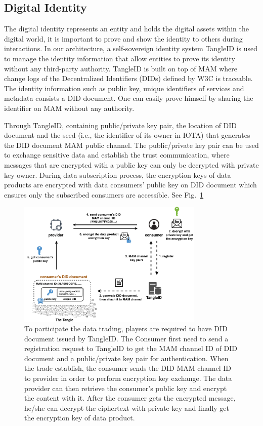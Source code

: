 \documentclass[conference]{IEEEtran}
\begin{document}
\subsection{Digital Identity}
The digital identity represents an entity and holds the digital assets within the digital world, it is important to prove and show the identity to others during interactions. In our architecture, a self-sovereign identity system TangleID\cite{TangleID} is used to manage the identity information that allow entities to prove its identity without any third-party authority. TangleID is built on top of MAM where change logs of the Decentralized Identifiers (DIDs)\cite{DID} defined by W3C is traceable. The identity information such as public key, unique identifiers of services and metadata consists a DID document. One can easily prove himself by sharing the identifier on MAM without any authority.

Through TangleID, containing public/private key pair, the location of DID document and the seed (i.e., the identifier of its owner in IOTA) that generates the DID document MAM public channel. The public/private key pair can be used to exchange sensitive data and establish the trust communication, where messages that are encrypted with a public key can only be decrypted with private key owner. During data subscription process, the encryption keys of data products are encrypted with data consumers' public key on DID document which ensures only the subscribed consumers are accessible. See Fig.~\ref{fig:TangleID}

\begin{figure}[h]
    \centering
    \includegraphics[width=3.5in]{TangleID}
    \caption{To participate the data trading, players are required to have DID document issued by TangleID. The Consumer first need to send a registration request to TangleID to get the MAM channel ID of DID document and a public/private key pair for authentication. When the trade establish, the consumer sends the DID MAM channel ID to provider in order to perform encryption key exchange. The data provider can then retrieve the consumer's public key and encrypt the content with it. After the consumer gets the encrypted message, he/she can decrypt the ciphertext with private key and finally get the encryption key of data product.}
    \label{fig:TangleID}
\end{figure}
\end{document}
